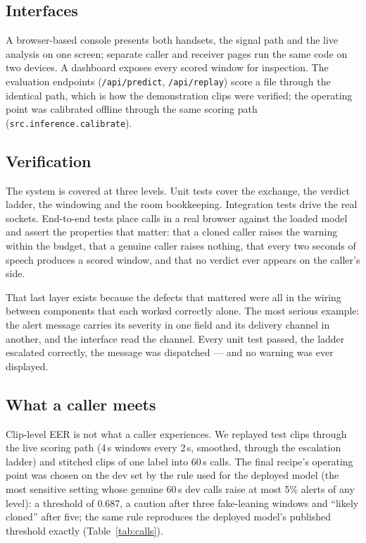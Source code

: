 \subsection{Interfaces}

A browser-based console presents both handsets, the signal path and the live
analysis on one screen; separate caller and receiver pages run the same code on two
devices. A dashboard exposes every scored window for inspection. The evaluation
endpoints (\texttt{/api/predict}, \texttt{/api/replay}) score a file through the
identical path, which is how the demonstration clips were verified; the operating point
was calibrated offline through the same scoring path (\texttt{src.inference.calibrate}).

\subsection{Verification}

The system is covered at three levels. Unit tests cover the exchange, the verdict
ladder, the windowing and the room bookkeeping. Integration tests drive the real
sockets. End-to-end tests place calls in a real browser against the loaded model and
assert the properties that matter: that a cloned caller raises the warning within
the budget, that a genuine caller raises nothing, that every two seconds of speech
produces a scored window, and that no verdict ever appears on the caller's side.

That last layer exists because the defects that mattered were all in the wiring
between components that each worked correctly alone. The most serious example: the
alert message carries its severity in one field and its delivery channel in another,
and the interface read the channel. Every unit test passed, the ladder escalated
correctly, the message was dispatched --- and no warning was ever displayed.

\subsection{What a caller meets}
\label{sec:system-calls}

Clip-level EER is not what a caller experiences. We replayed test clips through the live
scoring path (4\,s windows every 2\,s, smoothed, through the escalation ladder) and
stitched clips of one label into 60\,s calls. The final recipe's operating point was
chosen on the dev set by the rule used for the deployed model (the most sensitive setting
whose genuine 60\,s dev calls raise at most 5\% alerts of any level): a threshold of 0.687,
a caution after three fake-leaning windows and ``likely cloned'' after five; the same rule
reproduces the deployed model's published threshold exactly (Table~\ref{tab:calls}).

